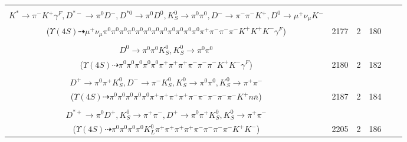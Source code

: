 \documentclass[landscape]{article}
\newcounter{rownumbers}
\newcommand\rn{\stepcounter{rownumbers}\arabic{rownumbers}}
\newcommand{\EOLP}{\\ \hline} %
\newcommand{\topoTags}[1]{#1} %
\begin{document}
\begin{longtable}{clcccc}
\rn & \makecell[l]{ $ 
\Upsilon(4S) \rightarrow B^{0} \bar{B}^{0} ,
B^{0} \rightarrow \pi^{0} \pi^{0} \pi^{0} \rho^{+} \eta \bar{K}^{0} K^{*} D^{*-} ,
\bar{B}^{0} \rightarrow \pi^{0} D^{*0} ,
\rho^{+} \rightarrow \pi^{0} \pi^{+} ,
\eta \rightarrow \pi^{0} \pi^{0} \pi^{0} ,
\bar{K}^{0} \rightarrow K_{S}^{0} ,
$ \\ $
K^{*} \rightarrow \pi^{-} K^{+} \gamma^{F} ,
D^{*-} \rightarrow \pi^{0} D^{-} ,
D^{*0} \rightarrow \pi^{0} D^{0} ,
K_{S}^{0} \rightarrow \pi^{0} \pi^{0} ,
D^{-} \rightarrow \pi^{-} \pi^{-} K^{+} ,
D^{0} \rightarrow \mu^{+} \nu_{\mu} K^{-} 
$ \\ ($
\Upsilon(4S) \dashrightarrow \mu^{+} \nu_{\mu} \pi^{0} \pi^{0} \pi^{0} \pi^{0} \pi^{0} \pi^{0} \pi^{0} \pi^{0} \pi^{0} \pi^{0} \pi^{0} \pi^{0} \pi^{+} \pi^{-} \pi^{-} \pi^{-} K^{+} K^{+} K^{-} \gamma^{F} 
$) } & \topoTags{2177 & }2 & 180 \EOLP

\rn & \makecell[l]{ $ 
\Upsilon(4S) \rightarrow B^{0} \bar{B}^{0} ,
B^{0} \rightarrow K^{0} K^{+} K^{-} \gamma^{F} ,
\bar{B}^{0} \rightarrow \pi^{0} \pi^{+} \pi^{-} \pi^{-} D^{*+} ,
K^{0} \rightarrow K_{S}^{0} ,
D^{*+} \rightarrow \pi^{+} D^{0} ,
K_{S}^{0} \rightarrow \pi^{+} \pi^{-} ,
$ \\ $
D^{0} \rightarrow \pi^{0} \pi^{0} K_{S}^{0} ,
K_{S}^{0} \rightarrow \pi^{0} \pi^{0} 
$ \\ ($
\Upsilon(4S) \dashrightarrow \pi^{0} \pi^{0} \pi^{0} \pi^{0} \pi^{0} \pi^{+} \pi^{+} \pi^{+} \pi^{-} \pi^{-} \pi^{-} K^{+} K^{-} \gamma^{F} 
$) } & \topoTags{2180 & }2 & 182 \EOLP

\rn & \makecell[l]{ $ 
\Upsilon(4S) \rightarrow B^{0} \bar{B}^{0} ,
B^{0} \rightarrow K^{+} D^{*-} ,
\bar{B}^{0} \rightarrow \rho^{0} \pi^{-} \omega D^{+} n \bar{n} ,
D^{*-} \rightarrow \pi^{0} D^{-} ,
\rho^{0} \rightarrow \pi^{+} \pi^{-} ,
\omega \rightarrow \pi^{0} \pi^{+} \pi^{-} ,
$ \\ $
D^{+} \rightarrow \pi^{0} \pi^{+} K_{S}^{0} ,
D^{-} \rightarrow \pi^{-} K_{S}^{0} ,
K_{S}^{0} \rightarrow \pi^{0} \pi^{0} ,
K_{S}^{0} \rightarrow \pi^{+} \pi^{-} 
$ \\ ($
\Upsilon(4S) \dashrightarrow \pi^{0} \pi^{0} \pi^{0} \pi^{0} \pi^{0} \pi^{+} \pi^{+} \pi^{+} \pi^{+} \pi^{-} \pi^{-} \pi^{-} \pi^{-} \pi^{-} K^{+} n \bar{n} 
$) } & \topoTags{2187 & }2 & 184 \EOLP

\rn & \makecell[l]{ $ 
\Upsilon(4S) \rightarrow B^{0} \bar{B}^{0} ,
B^{0} \rightarrow \pi^{0} \pi^{-} \rho^{+} K^{0} \bar{K}^{0} K^{+} K^{-} ,
\bar{B}^{0} \rightarrow \pi^{-} D^{*+} ,
\rho^{+} \rightarrow \pi^{0} \pi^{+} ,
K^{0} \rightarrow K_{L}^{0} ,
\bar{K}^{0} \rightarrow K_{S}^{0} ,
$ \\ $
D^{*+} \rightarrow \pi^{0} D^{+} ,
K_{S}^{0} \rightarrow \pi^{+} \pi^{-} ,
D^{+} \rightarrow \pi^{0} \pi^{+} K_{S}^{0} ,
K_{S}^{0} \rightarrow \pi^{+} \pi^{-} 
$ \\ ($
\Upsilon(4S) \dashrightarrow \pi^{0} \pi^{0} \pi^{0} \pi^{0} K_{L}^{0} \pi^{+} \pi^{+} \pi^{+} \pi^{+} \pi^{-} \pi^{-} \pi^{-} \pi^{-} K^{+} K^{-} 
$) } & \topoTags{2205 & }2 & 186 \EOLP


\end{longtable}
\end{document}
